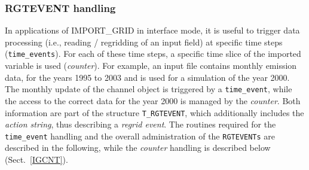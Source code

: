 \documentclass[11pt,twoside]{report}
\begin{document}
\subsubsection{RGTEVENT handling\label{IGevents}}
In applications of IMPORT\_GRID in interface mode, it is useful to trigger data
processing (i.e., reading / regridding of an input field) at specific
time steps (\verb|time_events|). For each of these time
steps, a specific time slice of the imported variable is used
({\it counter}).
For example, an input file contains monthly emission data, for the
years 1995 to 2003 and is used for a simulation of the year 2000.
The monthly update of the channel object is triggered by
a \verb|time_event|, while the access to the correct data for the year
2000 is managed by the {\it counter}. Both information are part of
the structure \verb|T_RGTEVENT|, which additionally includes
the {\it action string}, thus describing a {\it regrid
event}. The routines required for
the \verb|time_event| handling and the overall administration of
the \verb|RGTEVENTs| are described in the following,
 while the {\it counter} handling is described below (Sect.~\ref{IGCNT}).
\end{document}
